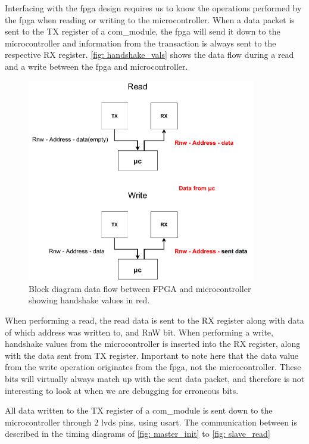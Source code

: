 \documentclass[main.tex]{subfiles}
\begin{document}
Interfacing with the \gls{fpga} design requires us to know the operations performed by the \gls{fpga} when reading or writing to the microcontroller. When a data packet is sent to the TX register of a com\_module, the \gls{fpga} will send it down to the microcontroller and information from the transaction is always sent to the respective RX register. \autoref{fig: handshake_vals} shows the data flow during a read and a write between the \gls{fpga} and microcontroller.

\begin{figure}[!htpb]
    \centering
    \includegraphics[width=10cm, scale=1]{images/handshake procedure.pdf}
    \caption{Block diagram data flow between FPGA and microcontroller showing handshake values in red.}
    \label{fig: handshake_vals}
\end{figure}
\FloatBarrier

When performing a read, the read data is sent to the RX register along with data of which address was written to, and RnW bit. When performing a write, handshake values from the microcontroller is inserted into the RX register, along with the data sent from TX register. Important to note here that the data value from the write operation originates from the \gls{fpga}, not the microcontroller. These bits will virtually always match up with the sent data packet, and therefore is not interesting to look at when we are debugging for erroneous bits.


All data written to the TX register of a com\_module is sent down to the microcontroller through 2 \gls{lvds} pins, using \acrshort{usart}. The communication between is described in the timing diagrams of \autoref{fig: master_init} to \autoref{fig: slave_read}
\end{document}
